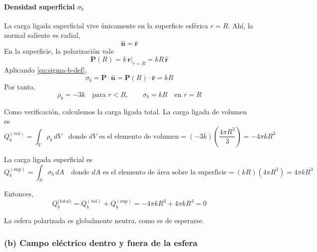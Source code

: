 \documentclass{article}
\begin{document}
\paragraph{Densidad superficial $\sigma_{b}$}

La carga ligada superficial vive únicamente en la superficie esférica $r = R$. Ahí, la normal saliente es radial,
\begin{equation}
\hat{\mathbf{n}} = \hat{\mathbf{r}}
\label{eq:n-hat}
\end{equation}
En la superficie, la polarización vale
\begin{equation}
\mathbf{P}(R) = k\,\mathbf{r}\big|_{r = R} = kR\,\hat{\mathbf{r}}
\label{eq:P-en-R}
\end{equation}
Aplicando \eqref{eq:sigma-b-def},
\begin{equation}
\sigma_{b} = \mathbf{P}\cdot \hat{\mathbf{n}} = \mathbf{P}(R)\cdot \hat{\mathbf{r}} = kR
\label{eq:sigma-b-final}
\end{equation}
Por tanto,
\begin{equation}
\rho_{b} = -3k \quad \text{para } r < R,
\qquad
\sigma_{b} = kR \quad \text{en } r = R
\label{eq:rho-sigma-resumen}
\end{equation}

Como verificación, calculemos la carga ligada total.  
La carga ligada de volumen es
\begin{equation}
Q_{b}^{(\text{vol})} 
= \int_{V} \rho_{b}\, dV
\quad \text{donde } dV \text{ es el elemento de volumen}
= (-3k)\left(\frac{4\pi R^{3}}{3}\right)
= -4\pi k R^{3}
\label{eq:Qb-vol}
\end{equation}

La carga ligada superficial es
\begin{equation}
Q_{b}^{(\text{sup})} 
= \int_{S} \sigma_{b}\, dA
\quad \text{donde } dA \text{ es el elemento de área sobre la superficie}
= (kR)(4\pi R^{2})
= 4\pi k R^{3}
\label{eq:Qb-sup}
\end{equation}

Entonces,
\begin{equation}
Q_{b}^{\text{(total)}} 
= Q_{b}^{(\text{vol})} + Q_{b}^{(\text{sup})} 
= -4\pi k R^{3} + 4\pi k R^{3}
= 0
\label{eq:Qb-total}
\end{equation}

La esfera polarizada es globalmente neutra, como es de esperarse.



\subsubsection*{(b) Campo eléctrico dentro y fuera de la esfera}
\end{document}
